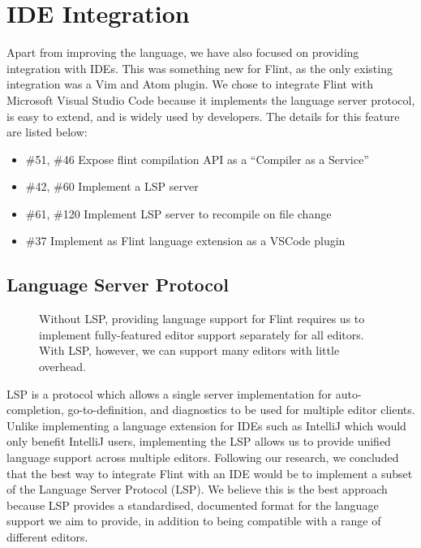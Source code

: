 \section{IDE Integration}

Apart from improving the language, we have also focused on providing integration with IDEs. This was something new for Flint, as the only existing integration was a Vim and Atom plugin. We chose to integrate Flint with Microsoft Visual Studio Code because it implements the language server protocol, is easy to extend, and is widely used by developers. The details for this feature are listed below:

\begin{itemize}
	\item \#51, \#46 Expose flint compilation API as a “Compiler as a Service”
	\item \#42, \#60 Implement a LSP server
	\item \#61, \#120 Implement LSP server to recompile on file change
	\item \#37 Implement as Flint language extension as a VSCode plugin
\end{itemize}

\subsection{Language Server Protocol}

\begin{figure}[H]
\centering
{}
\caption{Without LSP, providing language support for Flint requires us to implement fully-featured editor support separately for all editors. With LSP, however, we can support many editors with little overhead.}
\end{figure}

LSP is a protocol which allows a single server implementation for auto-completion, go-to-definition, and diagnostics to be used for multiple editor clients. Unlike implementing a language extension for IDEs such as IntelliJ which would only benefit IntelliJ users, implementing the LSP allows us to provide unified language support across multiple editors. Following our research, we concluded that the best way to integrate Flint with an IDE would be to implement a subset of the Language Server Protocol (LSP). We believe this is the best approach because LSP provides a standardised, documented format for the language support we aim to provide, in addition to being compatible with a range of different editors.

